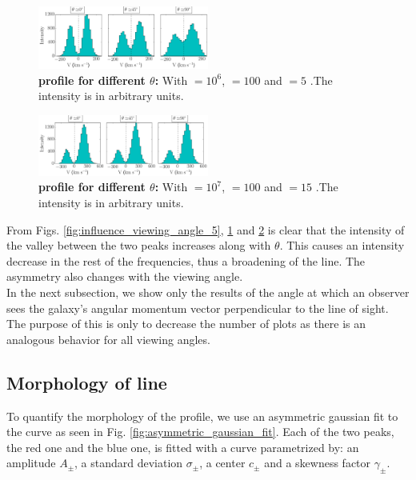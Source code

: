 \documentclass[twocolappendix]{latex/emulateapj}
\begin{document}
\begin{figure}[h!]
	\begin{center}
		\includegraphics[width=0.5\textwidth]{./figures/influence_viewing_angle_6}
	\end{center}
	\caption{\textbf{\lya profile for different $\theta$:} With \tauh$=10^6$, \vrot$=100$ \kms and \vout$=5$ \kms.The intensity is in arbitrary units.
		\label{fig:influence_viewing_angle_6}}
\end{figure}

\begin{figure}[h!]
	\begin{center}
		\includegraphics[width=0.5\textwidth]{./figures/influence_viewing_angle_7}
	\end{center}
	\caption{\textbf{\lya profile for different $\theta$:} With \tauh$=10^7$, \vrot$=100$ \kms and \vout$=15$ \kms.The intensity is in arbitrary units.
		\label{fig:influence_viewing_angle_7}}
\end{figure}

From Figs. \ref{fig:influence_viewing_angle_5}, \ref{fig:influence_viewing_angle_6} and \ref{fig:influence_viewing_angle_7} is clear that the intensity of the valley between the two peaks increases along with $\theta$. This causes an intensity decrease in the rest of the frequencies, thus a broadening of the line. The asymmetry also changes with the viewing angle.\\

In the next subsection, we show only the results of the angle at which an observer sees the galaxy's angular momentum vector perpendicular to the line of sight. The purpose of this is only to decrease the number of plots as there is an analogous behavior for all viewing angles. \\

\subsection{Morphology of \lya line}
To quantify the morphology of the \lya profile, we use an asymmetric gaussian fit to the curve as seen in Fig. \ref{fig:asymmetric_gaussian_fit}. Each of the two peaks, the red one and the blue one, is fitted with a curve parametrized by: an amplitude $A_{\pm}$, a standard deviation $\sigma_{\pm}$, a center $c_{\pm}$ and a skewness factor $\gamma_{\pm}$.\\
\end{document}
